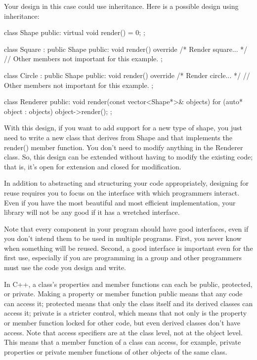 Your design in this case could use inheritance. Here is a possible design using inheritance:

\begin{cpp}
class Shape
{
    public:
    virtual void render() = 0;
};

class Square : public Shape
{
    public:
    void render() override { /* Render square... */ }
    // Other members not important for this example.
};

class Circle : public Shape
{
    public:
    void render() override { /* Render circle... */ }
    // Other members not important for this example.
};

class Renderer
{
    public:
    void render(const vector<Shape*>& objects)
    {
        for (auto* object : objects) { object->render(); }
    }
};
\end{cpp}

With this design, if you want to add support for a new type of shape, you just need to write a new class that derives from Shape and that implements the render() member function. You don’t need to modify anything in the Renderer class. So, this design can be extended without having to modify the existing code; that is, it’s open for extension and closed for modification.


In addition to abstracting and structuring your code appropriately, designing for reuse requires you to focus on the interface with which programmers interact. Even if you have the most beautiful and most efficient implementation, your library will not be any good if it has a wretched interface.

Note that every component in your program should have good interfaces, even if you don’t intend them to be used in multiple programs. First, you never know when something will be reused. Second, a good interface is important even for the first use, especially if you are programming in a group and other programmers must use the code you design and write.

In C++, a class’s properties and member functions can each be public, protected, or private. Making a property or member function public means that any code can access it; protected means that only the class itself and its derived classes can access it; private is a stricter control, which means that not only is the property or member function locked for other code, but even derived classes don’t have access. Note that access specifiers are at the class level, not at the object level. This means that a member function of a class can access, for example, private properties or private member functions of other objects of the same class.

